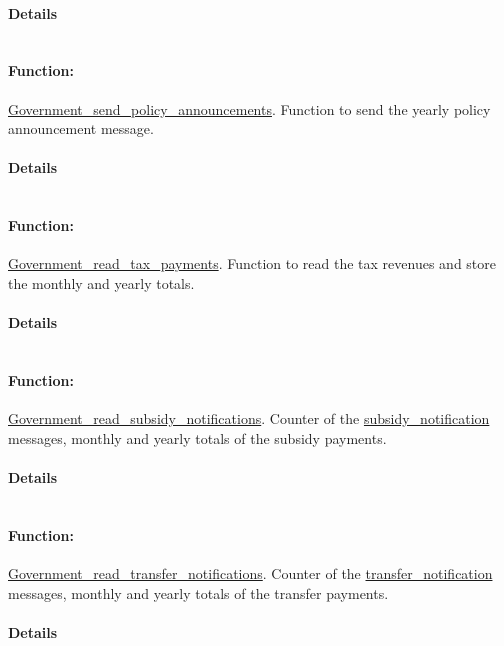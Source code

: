 \documentclass[a4paper,11pt]{article}
\begin{document}
\paragraph{Details}
\begin{verbatim}
\end{verbatim}
\paragraph{Function:}\url{Government_send_policy_announcements}.
Function to send the yearly policy announcement message.
\paragraph{Details}
\begin{verbatim}
\end{verbatim}
\paragraph{Function:}\url{Government_read_tax_payments}.
Function to read the tax revenues and store the monthly and yearly totals.
\paragraph{Details}
\begin{verbatim}
\end{verbatim}
\paragraph{Function:}\url{Government_read_subsidy_notifications}.
Counter of the \url{subsidy\_notification} messages, monthly and yearly totals of the subsidy payments.
\paragraph{Details}
\begin{verbatim}
\end{verbatim}
\paragraph{Function:}\url{Government_read_transfer_notifications}.
Counter of the \url{transfer\_notification} messages, monthly and yearly totals of the transfer payments.
\paragraph{Details}
\begin{verbatim}
\end{verbatim}
\end{document}
